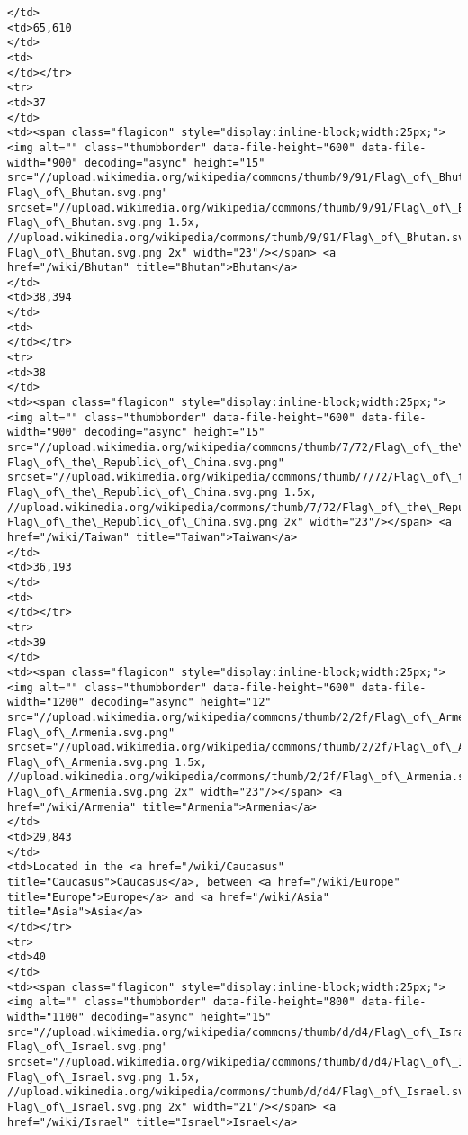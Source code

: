 \documentclass[11pt]{article}
\begin{document}
\begin{Verbatim}[commandchars=\\\{\}]
</td>
<td>65,610
</td>
<td>
</td></tr>
<tr>
<td>37
</td>
<td><span class="flagicon" style="display:inline-block;width:25px;"><img alt="" class="thumbborder" data-file-height="600" data-file-width="900" decoding="async" height="15" src="//upload.wikimedia.org/wikipedia/commons/thumb/9/91/Flag\_of\_Bhutan.svg/23px-Flag\_of\_Bhutan.svg.png" srcset="//upload.wikimedia.org/wikipedia/commons/thumb/9/91/Flag\_of\_Bhutan.svg/35px-Flag\_of\_Bhutan.svg.png 1.5x, //upload.wikimedia.org/wikipedia/commons/thumb/9/91/Flag\_of\_Bhutan.svg/45px-Flag\_of\_Bhutan.svg.png 2x" width="23"/></span> <a href="/wiki/Bhutan" title="Bhutan">Bhutan</a>
</td>
<td>38,394
</td>
<td>
</td></tr>
<tr>
<td>38
</td>
<td><span class="flagicon" style="display:inline-block;width:25px;"><img alt="" class="thumbborder" data-file-height="600" data-file-width="900" decoding="async" height="15" src="//upload.wikimedia.org/wikipedia/commons/thumb/7/72/Flag\_of\_the\_Republic\_of\_China.svg/23px-Flag\_of\_the\_Republic\_of\_China.svg.png" srcset="//upload.wikimedia.org/wikipedia/commons/thumb/7/72/Flag\_of\_the\_Republic\_of\_China.svg/35px-Flag\_of\_the\_Republic\_of\_China.svg.png 1.5x, //upload.wikimedia.org/wikipedia/commons/thumb/7/72/Flag\_of\_the\_Republic\_of\_China.svg/45px-Flag\_of\_the\_Republic\_of\_China.svg.png 2x" width="23"/></span> <a href="/wiki/Taiwan" title="Taiwan">Taiwan</a>
</td>
<td>36,193
</td>
<td>
</td></tr>
<tr>
<td>39
</td>
<td><span class="flagicon" style="display:inline-block;width:25px;"><img alt="" class="thumbborder" data-file-height="600" data-file-width="1200" decoding="async" height="12" src="//upload.wikimedia.org/wikipedia/commons/thumb/2/2f/Flag\_of\_Armenia.svg/23px-Flag\_of\_Armenia.svg.png" srcset="//upload.wikimedia.org/wikipedia/commons/thumb/2/2f/Flag\_of\_Armenia.svg/35px-Flag\_of\_Armenia.svg.png 1.5x, //upload.wikimedia.org/wikipedia/commons/thumb/2/2f/Flag\_of\_Armenia.svg/46px-Flag\_of\_Armenia.svg.png 2x" width="23"/></span> <a href="/wiki/Armenia" title="Armenia">Armenia</a>
</td>
<td>29,843
</td>
<td>Located in the <a href="/wiki/Caucasus" title="Caucasus">Caucasus</a>, between <a href="/wiki/Europe" title="Europe">Europe</a> and <a href="/wiki/Asia" title="Asia">Asia</a>
</td></tr>
<tr>
<td>40
</td>
<td><span class="flagicon" style="display:inline-block;width:25px;"><img alt="" class="thumbborder" data-file-height="800" data-file-width="1100" decoding="async" height="15" src="//upload.wikimedia.org/wikipedia/commons/thumb/d/d4/Flag\_of\_Israel.svg/21px-Flag\_of\_Israel.svg.png" srcset="//upload.wikimedia.org/wikipedia/commons/thumb/d/d4/Flag\_of\_Israel.svg/32px-Flag\_of\_Israel.svg.png 1.5x, //upload.wikimedia.org/wikipedia/commons/thumb/d/d4/Flag\_of\_Israel.svg/41px-Flag\_of\_Israel.svg.png 2x" width="21"/></span> <a href="/wiki/Israel" title="Israel">Israel</a>

\end{Verbatim}
\end{document}

